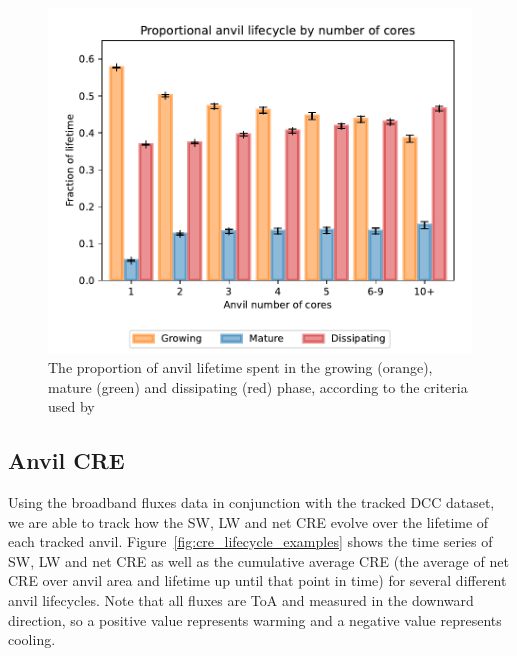 \documentclass[acp, manuscript]{copernicus}
\begin{document}
\begin{figure}[tp]
    \includegraphics[width=12cm]{figures/fig09.pdf}
    \caption[
    The proportion of anvil lifetime spent in the growing, mature and dissipating phase
    ]{
    The proportion of anvil lifetime spent in the growing (orange), mature (green) and dissipating (red) phase, according to the criteria used by \citet{futyan_deep_2007}
    }
    \label{fig:seviri_lifetime_proportions}
\end{figure}


\subsection{Anvil CRE}

Using the broadband fluxes data in conjunction with the tracked DCC dataset, we are able to track how the SW, LW and net CRE evolve over the lifetime of each tracked anvil.
Figure~\ref{fig:cre_lifecycle_examples} shows the time series of SW, LW and net CRE as well as the cumulative average CRE (the average of net CRE over anvil area and lifetime up until that point in time) for several different anvil lifecycles.
Note that all fluxes are ToA and measured in the downward direction, so a positive value represents warming and a negative value represents cooling.
\end{document}
